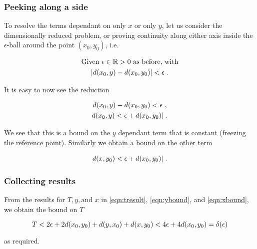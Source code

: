 \begin{frame}
    \frametitle{Peeking along a side}

    To resolve the terms dependant on only \(x\) or only \(y\), let us consider
    the dimensionally reduced problem, or proving continuity along either axis
    inside the \(\epsilon\)-ball around the point \((x_0, y_0)\), i.e.

    \begin{gather*}
        \text{Given } \epsilon \in \mathbb{R} > 0 \text{ as before, with} \\
        |d(x_0, y) - d(x_0, y_0)| < \epsilon~.
    \end{gather*}

    \pause

    It is easy to now see the reduction

    \begin{gather}
        d(x_0, y) - d(x_0, y_0) < \epsilon~, \nonumber \\
        d(x_0, y) < \epsilon + d(x_0, y_0)|~.
        \label{eqn:ybound}
    \end{gather}

    We see that this is a bound on the \(y\) dependant term that is constant
    (freezing the reference point). Similarly we obtain a bound on the other
    term

    \begin{gather}
        d(x, y_0) < \epsilon + d(x_0, y_0)|~.
        \label{eqn:xbound}
    \end{gather}

\end{frame}

\begin{frame}
    \frametitle{Collecting results}

    From the results for \(T, y, \text{and } x\) in \autoref{eqn:tresult},
    \autoref{eqn:ybound}, and \autoref{eqn:xbound}, we obtain the bound on \(T\)

    \begin{equation}
        T < 2\epsilon + 2d(x_0, y_0) + d(y, x_0)+ d(x, y_0) < 4\epsilon + 4d(x_0, y_0) = \delta(\epsilon)
    \end{equation}

    as required.

\end{frame}

